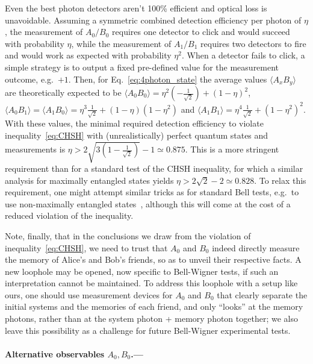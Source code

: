 \documentclass[aps,floatfix,superscriptaddress,twocolumn,tightenlines,amsmath,amssymb,nofootinbib,10pt]{revtex4-1}
\begin{document}
Even the best photon detectors aren't 100\% efficient and optical loss is unavoidable. Assuming a symmetric combined detection efficiency per photon of $\eta$, the measurement of $A_0/B_0$ requires one detector to click and would succeed with probability $\eta$, while the measurement of $A_1/B_1$ requires two detectors to fire and would work as expected with probability $\eta^2$. When a detector fails to click, a simple strategy is to output a fixed pre-defined value for the measurement outcome, e.g.\ $+1$. Then, for Eq.~\eqref{eq:4photon_state} the average values $\langle A_{x}B_{y} \rangle$ are theoretically expected to be $\langle A_{0}B_{0} \rangle = \eta^2(-\frac{1}{\sqrt{2}}) + (1-\eta)^2$, $\langle A_{0}B_{1} \rangle = \langle A_{1}B_{0} \rangle = \eta^3\frac{1}{\sqrt{2}} + (1-\eta)(1-\eta^2)$ and $\langle A_{1}B_{1} \rangle = \eta^4\frac{1}{\sqrt{2}} + (1-\eta^2)^2$. With these values, the minimal required detection efficiency to violate inequality~\eqref{eq:CHSH} with (unrealistically) perfect quantum states and measurements is $\eta > 2\sqrt{3(1-\frac{1}{\sqrt{2}})}-1 \simeq 0.875$. This is a more stringent requirement than for a standard test of the CHSH inequality, for which a similar analysis for maximally entangled states yields $\eta > 2\sqrt{2}-2 \simeq 0.828$. To relax this requirement, one might attempt similar tricks as for standard Bell tests, e.g.\ to use non-maximally entangled states~\cite{Eberhard1993}, although this will come at the cost of a reduced violation of the inequality.

Note, finally, that in the conclusions we draw from the violation of inequality~\eqref{eq:CHSH}, we need to trust that $A_0$ and $B_0$ indeed directly measure the memory of Alice's and Bob's friends, so as to unveil their respective facts. A new loophole may be opened, now specific to Bell-Wigner tests, if such an interpretation cannot be maintained. To address this loophole with a setup like ours, one should use measurement devices for $A_0$ and $B_0$ that clearly separate the initial systems and the memories of each friend, and only ``looks'' at the memory photons, rather than at the system photon + memory photon together; we also leave this possibility as a challenge for future Bell-Wigner experimental tests.

\bigskip
\paragraph*{Alternative observables $A_0, B_0$.--- }
\end{document}
